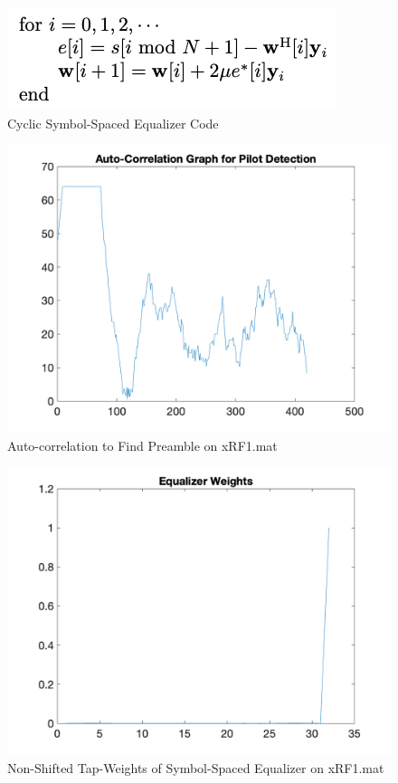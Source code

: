 \begin{figure}[h!]
    \centering
    \includegraphics[scale=1]{figures/equalizer code.png}
    \caption{Cyclic Symbol-Spaced Equalizer Code}
    \label{fig:symbol-code}
\end{figure}
\begin{figure}[h!]
    \centering
    \includegraphics[scale=0.4]{figures/auto-correlation.png}
    \caption{Auto-correlation to Find Preamble on xRF1.mat}
    \label{fig:auto-corr}
\end{figure}
\begin{figure}[h!]
    \centering
    \includegraphics[scale=0.4]{figures/non_shifted_weights.png}
    \caption{Non-Shifted Tap-Weights of Symbol-Spaced Equalizer on xRF1.mat}
    \label{fig:non-circ-weights}
\end{figure}
